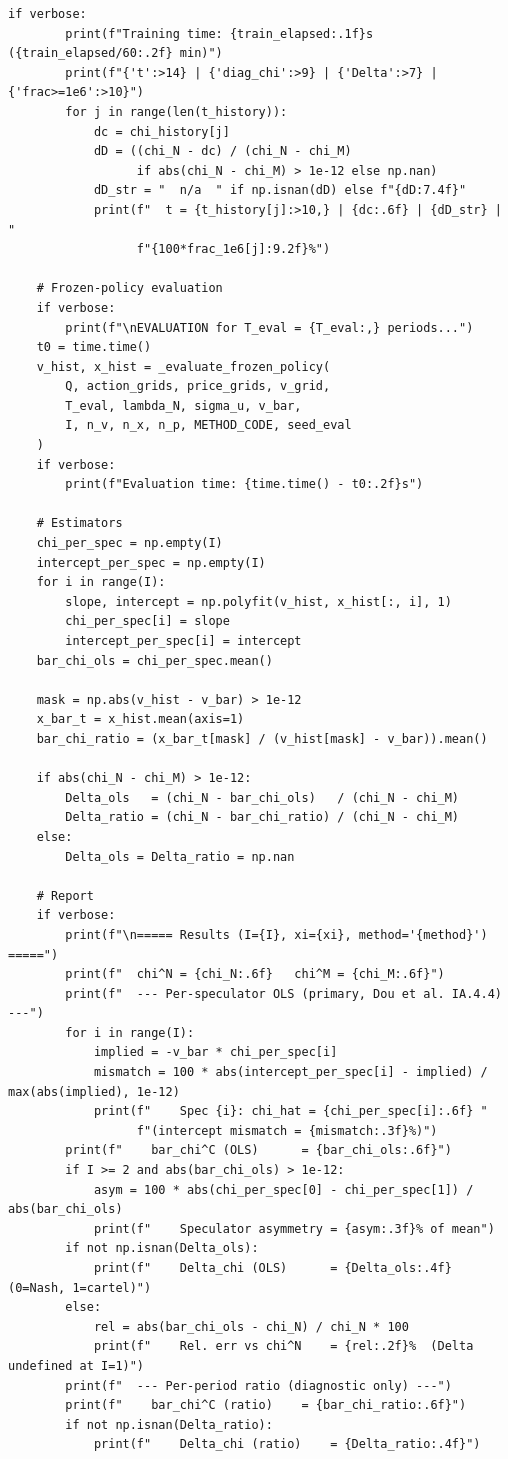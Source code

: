 \begin{lstlisting}[style=pythonstyle]
    if verbose:
        print(f"Training time: {train_elapsed:.1f}s ({train_elapsed/60:.2f} min)")
        print(f"{'t':>14} | {'diag_chi':>9} | {'Delta':>7} | {'frac>=1e6':>10}")
        for j in range(len(t_history)):
            dc = chi_history[j]
            dD = ((chi_N - dc) / (chi_N - chi_M)
                  if abs(chi_N - chi_M) > 1e-12 else np.nan)
            dD_str = "  n/a  " if np.isnan(dD) else f"{dD:7.4f}"
            print(f"  t = {t_history[j]:>10,} | {dc:.6f} | {dD_str} | "
                  f"{100*frac_1e6[j]:9.2f}%")

    # Frozen-policy evaluation
    if verbose:
        print(f"\nEVALUATION for T_eval = {T_eval:,} periods...")
    t0 = time.time()
    v_hist, x_hist = _evaluate_frozen_policy(
        Q, action_grids, price_grids, v_grid,
        T_eval, lambda_N, sigma_u, v_bar,
        I, n_v, n_x, n_p, METHOD_CODE, seed_eval
    )
    if verbose:
        print(f"Evaluation time: {time.time() - t0:.2f}s")

    # Estimators
    chi_per_spec = np.empty(I)
    intercept_per_spec = np.empty(I)
    for i in range(I):
        slope, intercept = np.polyfit(v_hist, x_hist[:, i], 1)
        chi_per_spec[i] = slope
        intercept_per_spec[i] = intercept
    bar_chi_ols = chi_per_spec.mean()

    mask = np.abs(v_hist - v_bar) > 1e-12
    x_bar_t = x_hist.mean(axis=1)
    bar_chi_ratio = (x_bar_t[mask] / (v_hist[mask] - v_bar)).mean()

    if abs(chi_N - chi_M) > 1e-12:
        Delta_ols   = (chi_N - bar_chi_ols)   / (chi_N - chi_M)
        Delta_ratio = (chi_N - bar_chi_ratio) / (chi_N - chi_M)
    else:
        Delta_ols = Delta_ratio = np.nan

    # Report
    if verbose:
        print(f"\n===== Results (I={I}, xi={xi}, method='{method}') =====")
        print(f"  chi^N = {chi_N:.6f}   chi^M = {chi_M:.6f}")
        print(f"  --- Per-speculator OLS (primary, Dou et al. IA.4.4) ---")
        for i in range(I):
            implied = -v_bar * chi_per_spec[i]
            mismatch = 100 * abs(intercept_per_spec[i] - implied) / max(abs(implied), 1e-12)
            print(f"    Spec {i}: chi_hat = {chi_per_spec[i]:.6f} "
                  f"(intercept mismatch = {mismatch:.3f}%)")
        print(f"    bar_chi^C (OLS)      = {bar_chi_ols:.6f}")
        if I >= 2 and abs(bar_chi_ols) > 1e-12:
            asym = 100 * abs(chi_per_spec[0] - chi_per_spec[1]) / abs(bar_chi_ols)
            print(f"    Speculator asymmetry = {asym:.3f}% of mean")
        if not np.isnan(Delta_ols):
            print(f"    Delta_chi (OLS)      = {Delta_ols:.4f}   (0=Nash, 1=cartel)")
        else:
            rel = abs(bar_chi_ols - chi_N) / chi_N * 100
            print(f"    Rel. err vs chi^N    = {rel:.2f}%  (Delta undefined at I=1)")
        print(f"  --- Per-period ratio (diagnostic only) ---")
        print(f"    bar_chi^C (ratio)    = {bar_chi_ratio:.6f}")
        if not np.isnan(Delta_ratio):
            print(f"    Delta_chi (ratio)    = {Delta_ratio:.4f}")


\end{lstlisting}
